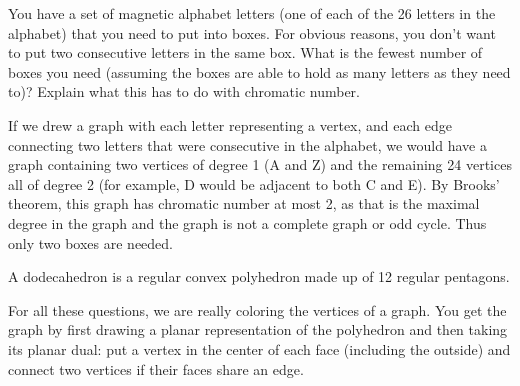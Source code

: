 \begin{questions}
\question You have a set of magnetic alphabet letters (one of each of the 26 letters in the alphabet) that you need to put into boxes. For obvious reasons, you don't want to put two consecutive letters in the same box. What is the fewest number of boxes you need (assuming the boxes are able to hold as many letters as they need to)?  Explain what this has to do with chromatic number.

\begin{answer}
	If we drew a graph with each letter representing a vertex, and each edge connecting two letters that were consecutive in the alphabet, we would have a graph containing two vertices of degree 1 (A and Z) and the remaining 24 vertices all of degree 2 (for example, D would be adjacent to both C and E). By Brooks' theorem, this graph has chromatic number at most 2, as that is the maximal degree in the graph and the graph is not a complete graph or odd cycle. Thus only two boxes are needed.
\end{answer}




\question A dodecahedron is a regular convex polyhedron made up of 12 regular pentagons.


	\begin{answer}
		For all these questions, we are really coloring the vertices of a graph.  You get the graph by first drawing a planar representation of the polyhedron and then taking its planar dual: put a vertex in the center of each face (including the outside) and connect two vertices if their faces share an edge.
\end{answer}
\end{questions}
